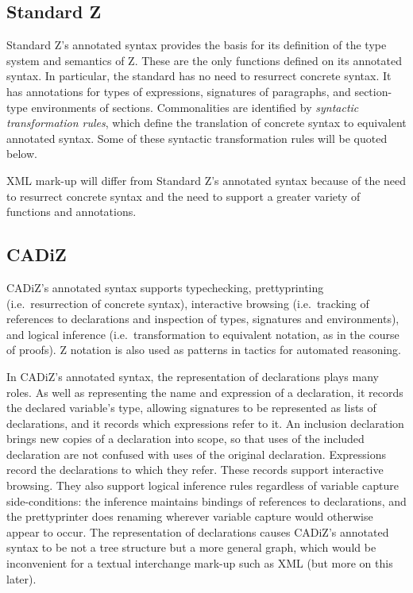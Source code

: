 \documentclass{llncs}  %
\newcommand{\CADiZ}{CADiZ}
\begin{document}
\subsection{Standard Z}

Standard Z's annotated syntax provides the basis for its definition
of the type system and semantics of Z.
These are the only functions defined on its annotated syntax.
In particular, the standard has no need to resurrect concrete syntax.
It has annotations for types of expressions,
signatures of paragraphs, and section-type environments of sections.
Commonalities are identified by \textit{syntactic transformation rules},
which define the translation of concrete syntax to equivalent annotated syntax.
Some of these syntactic transformation rules will be quoted below.

XML mark-up will differ from Standard Z's annotated syntax
because of the need to resurrect concrete syntax
and the need to support a greater variety of functions and annotations.

\subsection{\CADiZ}

\CADiZ's annotated syntax supports typechecking,
prettyprinting (i.e.\ resurrection of concrete syntax),
interactive browsing (i.e.\ tracking of references to declarations
and inspection of types, signatures and environments),
and logical inference (i.e.\ transformation to equivalent notation,
as in the course of proofs).
Z notation is also used as patterns in tactics for automated reasoning.

In \CADiZ's annotated syntax,
the representation of declarations plays many roles.
As well as representing the name and expression of a declaration,
it records the declared variable's type,
allowing signatures to be represented as lists of declarations,
and it records which expressions refer to it.
An inclusion declaration brings new copies of a declaration into scope,
so that uses of the included declaration are not
confused with uses of the original declaration.
Expressions record the declarations to which they refer.
These records support interactive browsing.
They also support logical inference rules
regardless of variable capture side-conditions:
the inference maintains bindings of references to declarations,
and the prettyprinter does renaming
wherever variable capture would otherwise appear to occur.
The representation of declarations causes \CADiZ's annotated syntax
to be not a tree structure but a more general graph,
which would be inconvenient for a textual interchange mark-up such as XML
(but more on this later).
\end{document}
